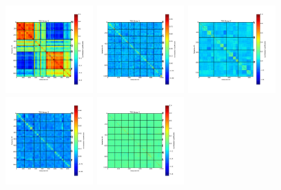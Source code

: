 \begin{figure}[ht]
\begin{center}
\includegraphics[width=0.3\textwidth]{Figures/NoiseTests/corrmat_TOI_CM_array_3_20170228s151.pdf}
\includegraphics[width=0.3\textwidth]{Figures/NoiseTests/corrmat_TOI_PCA_array_1_20170228s151.pdf}
\includegraphics[width=0.3\textwidth]{Figures/NoiseTests/corrmat_TOI_PCA_array_2_20170228s151.pdf}
\includegraphics[width=0.3\textwidth]{Figures/NoiseTests/corrmat_TOI_PCA_array_3_20170228s151.pdf}
\includegraphics[width=0.3\textwidth]{Figures/NoiseTests/corrmat_TOI_BCP_array_1_20170228s151.pdf}

\end{center}
\end{figure}
